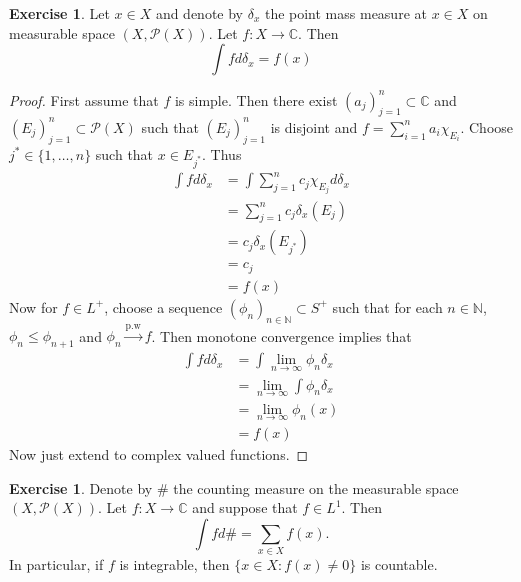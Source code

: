 \documentclass{book}
\theoremstyle{definition}
\newtheorem{ex}[definition]{Exercise}
\newcommand{\del}{\delta}
\newcommand{\C}{\mathbb{C}}
\newcommand{\N}{\mathbb{N}}
\newcommand{\MP}{\mathcal{P}}
\newcommand{\lex}[1]{\label{ex:#1}}
\DeclareMathOperator*{\0}{\mbf{0}}
\DeclareMathOperator*{\1}{\mbf{1}}
\newcommand{\limn}{\lim \limits_{n \rightarrow \infty}}
\begin{document}
	\begin{ex} \lex{00000} 
		Let $x \in X$ and denote by $\del_x$ the point mass measure at $x \in X$ on  measurable space $(X, \MP(X))$. Let $f:X \rightarrow \C$. Then $$\int f d \del_x = f(x)$$  
	\end{ex}
	
	\begin{proof}
		First assume that $f$ is simple. Then there exist $(a_j)_{j=1}^n \subset \C$ and $(E_j)_{j=1}^n \subset \MP(X)$ such that $(E_j)_{j=1}^n$ is disjoint and $f = \sum_{i = 1}^n a_i\chi_{E_i}$. Choose $j^* \in \{1, \ldots, n\}$ such that $x \in E_{j^*}$. Thus 
		\begin{align*}
		\int f d\del_x 
		&= \int \sum_{j=1}^n c_j \chi_{E_j} d \del_x \\
		&= \sum_{j=1}^n c_j \del_x(E_j) \\
		&= c_j \del_x(E_{j^*}) \\
		&= c_j \\
		&= f(x)
		\end{align*} 
		Now for $f \in L^+$, choose a sequence $(\phi_n)_{n \in \N} \subset S^+$ such that for each $n \in \N$, $\phi_n \leq \phi_{n+1}$ and $\phi_n \xrightarrow{\text{p.w}} f$. Then monotone convergence implies that 
		\begin{align*}
		\int f d \del_x 
		&= \int \limn \phi_n  \del_x \\
		&= \limn \int \phi_n \del_x \\
		&= \limn \phi_n(x) \\
		&= f(x) 
		\end{align*}
		Now just extend to complex valued functions.
		
	\end{proof}
	
	\begin{ex} \lex{00000} 
		Denote by $\#$ the counting measure on the measurable space $(X, \MP(X))$. Let $f:X \rightarrow \C$ and suppose that $f \in L^1$. Then $$\int f d\# = \sum_{x \in X}f(x).$$ In particular, if $f$ is integrable, then $\{x \in X: f(x) \neq 0\}$ is countable.
	\end{ex}
	
\end{document}
